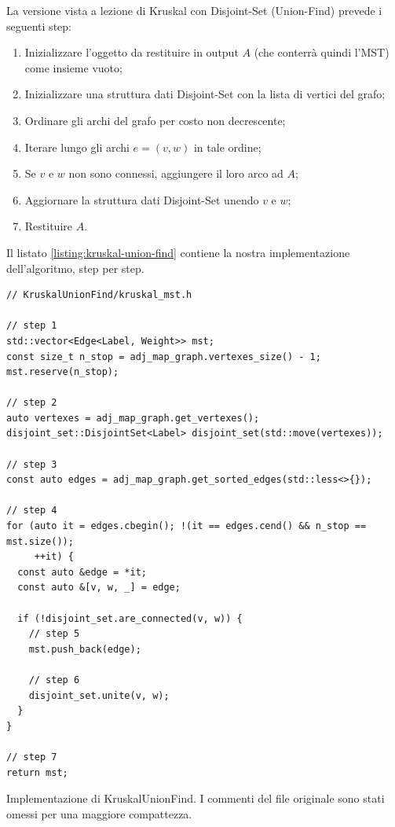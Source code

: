 La versione vista a lezione di Kruskal con Disjoint-Set (Union-Find) prevede i seguenti step:

\begin{enumerate}
    \item Inizializzare l'oggetto da restituire in output $A$ (che conterrà quindi l'MST) come insieme vuoto;
    \item Inizializzare una struttura dati Disjoint-Set con la lista di vertici del grafo;
    \item Ordinare gli archi del grafo per costo non decrescente;
    \item Iterare lungo gli archi $e = (v, w)$ in tale ordine;
    \item Se $v$ e $w$ non sono connessi, aggiungere il loro arco ad $A$;
    \item Aggiornare la struttura dati Disjoint-Set unendo $v$ e $w$;
    \item Restituire $A$.
\end{enumerate}

\noindent Il listato \ref{listing:kruskal-union-find} contiene la nostra implementazione dell'algoritmo, step per step.

\begin{listing}[!ht]
\begin{verbatim}
// KruskalUnionFind/kruskal_mst.h

// step 1
std::vector<Edge<Label, Weight>> mst;
const size_t n_stop = adj_map_graph.vertexes_size() - 1;
mst.reserve(n_stop);

// step 2
auto vertexes = adj_map_graph.get_vertexes();
disjoint_set::DisjointSet<Label> disjoint_set(std::move(vertexes));

// step 3
const auto edges = adj_map_graph.get_sorted_edges(std::less<>{});

// step 4
for (auto it = edges.cbegin(); !(it == edges.cend() && n_stop == mst.size());
     ++it) {
  const auto &edge = *it;
  const auto &[v, w, _] = edge;

  if (!disjoint_set.are_connected(v, w)) {
    // step 5
    mst.push_back(edge);

    // step 6
    disjoint_set.unite(v, w);
  }
}

// step 7
return mst;
\end{verbatim}
\caption{Implementazione di KruskalUnionFind. I commenti del file originale sono stati omessi per una maggiore compattezza.}
\label{listing:kruskal-union-find}
\end{listing}

